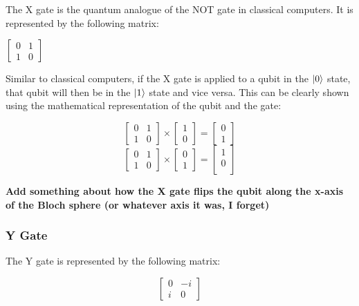 \documentclass{article}
\begin{document}
The X gate is the quantum analogue of the NOT gate in classical computers. It is represented by the following matrix:

\begin{center}
	$
	\begin{bmatrix}
		0 & 1 \\
		1 & 0
	\end{bmatrix}
	$
\end{center}

Similar to classical computers, if the X gate is applied to a qubit in the $\ket{0}$ state, that qubit will then be in the $\ket{1}$ state and vice versa. This can be clearly
shown using the mathematical representation of the qubit and the gate:

\[
	\begin{bmatrix}
		0 & 1 \\
		1 & 0
	\end{bmatrix}
	\times
	\begin{bmatrix}
		1 \\
		0
	\end{bmatrix}
	=
	\begin{bmatrix}
		0 \\
		1
	\end{bmatrix}
\]
\[
	\begin{bmatrix}
		0 & 1 \\
		1 & 0
	\end{bmatrix}
	\times
	\begin{bmatrix}
		0 \\
		1
	\end{bmatrix}
	=
	\begin{bmatrix}
		1 \\
		0 \\
	\end{bmatrix}
\]

\textbf{Add something about how the X gate flips the qubit along the x-axis of the Bloch sphere (or whatever axis it was, I forget)}

\subsubsection{Y Gate}
\label{sec:ygate}

The Y gate is represented by the following matrix:

\[
	\begin{bmatrix}
		0 & -i \\
		i & 0
	\end{bmatrix}
\]
\end{document}
